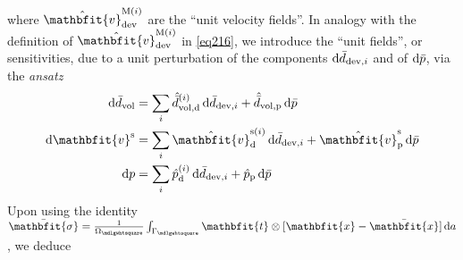 \documentclass[10pt,a4paper]{article}
\renewcommand{\ta}[1]{\mathbfit{#1}}
\renewcommand{\ts}[1]{\mathbfit{#1}}
\renewcommand{\Box}{\mdlgwhtsquare}
\newcommand{\ded}{\mathrm{d}}
\newcommand{\dep}{\mathrm{p}}
\begin{document}
where $\hat{\ta{v}}^{\macro(i)}_\dev$ are the ``unit velocity fields''. 
In analogy with the definition of $\hat{\ta{v}}^{\macro(i)}_\dev$
in \eqref{eq216}, we introduce the ``unit fields'', or sensitivities, due to a unit perturbation of the components $\operatorname{d \!}\bar{d}_{\mathrm{dev},i}$ and of $\operatorname{d \!}\bar{p}$, via the \emph{ansatz}
\begin{align}
    \dif\bar{d}_\vol &= \sum_i \hat{\bar{d}}_{\vol,\ded}^{(i)}\dif\bar{d}_{\dev,i} + \hat{\bar{d}}_{\vol,\dep} \dif \bar{p}
\\
    \dif\ta v^\fluct &= \sum_i \hat{\ta{v}}_{\ded}^{\fluct(i)}\dif\bar{d}_{\dev,i} + \hat{\ta v}_{\dep}^\fluct \dif \bar{p}
\\
    \dif p           &= \sum_i \hat{p}_{\ded}^{(i)}\dif\bar{d}_{\dev,i} + \hat{p}_{\dep} \dif \bar{p}
\end{align}
Upon using the identity $\bar{\ts\sigma}=\frac{1}{\Omega_\Box} \int_{\Gamma_\Box} \ts t \outerp [\ta x - \bar{\ta x}]\dif a$, we deduce
\end{document}
